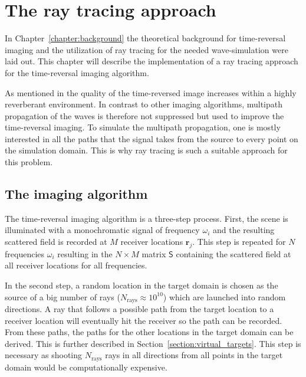 
\chapter{The ray tracing approach}\label{chapter:the_raytracing_approach}
In Chapter~\ref{chapter:background} the theoretical background for time-reversal imaging and the utilization of ray tracing for the needed wave-simulation were laid out.
This chapter will describe the implementation of a ray tracing approach for the time-reversal imaging algorithm.

As mentioned in \parencite{dyab_critical_2013} the quality of the time-reversed image increases within a highly reverberant environment.
In contrast to other imaging algorithms, multipath propagation of the waves is therefore not suppressed but used to improve the time-reversal imaging.
To simulate the multipath propagation, one is mostly interested in all the paths that the signal takes from the source to every point on the simulation domain.
This is why ray tracing is such a suitable approach for this problem.

\section{The imaging algorithm}
The time-reversal imaging algorithm is a three-step process.
First, the scene is illuminated with a monochromatic signal of frequency \(\omega_i\) and the resulting scattered field is recorded at \(M\) receiver locations \(\mathbf{r}_j\). 
This step is repeated for \(N\) frequencies \(\omega_i\) resulting in the \(N \times M\) matrix \(\mathsf{S} \) containing the scattered field at all receiver locations for all frequencies.

In the second step, a random location in the target domain is chosen as the source of a big number of rays (\(N_{\text{rays}}\approx 10^{10}\)) which are launched into random directions.
A ray that follows a possible path from the target location to a receiver location will eventually hit the receiver so the path can be recorded.
From these paths, the paths for the other locations in the target domain can be derived.
This is further described in Section~\ref{section:virtual_targets}.
This step is necessary as shooting \(N_{\text{rays}}\) rays in all directions from all points in the target domain would be computationally expensive.

